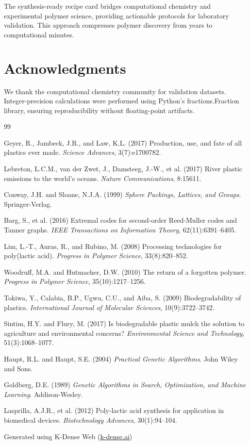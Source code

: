 \documentclass[11pt]{article}
\begin{document}
The synthesis-ready recipe card bridges computational chemistry and experimental polymer science, providing actionable protocols for laboratory validation. This approach compresses polymer discovery from years to computational minutes.

\section*{Acknowledgments}

We thank the computational chemistry community for validation datasets. Integer-precision calculations were performed using Python's fractions.Fraction library, ensuring reproducibility without floating-point artifacts.

\begin{thebibliography}{99}

 Geyer, R., Jambeck, J.R., and Law, K.L. (2017) Production, use, and fate of all plastics ever made. \textit{Science Advances}, 3(7):e1700782.

 Lebreton, L.C.M., van der Zwet, J., Damsteeg, J.-W., et al. (2017) River plastic emissions to the world's oceans. \textit{Nature Communications}, 8:15611.

 Conway, J.H. and Sloane, N.J.A. (1999) \textit{Sphere Packings, Lattices, and Groups}. Springer-Verlag.

 Barg, S., et al. (2016) Extremal codes for second-order Reed-Muller codes and Tanner graphs. \textit{IEEE Transactions on Information Theory}, 62(11):6391--6405.

 Lim, L.-T., Auras, R., and Rubino, M. (2008) Processing technologies for poly(lactic acid). \textit{Progress in Polymer Science}, 33(8):820--852.

 Woodruff, M.A. and Hutmacher, D.W. (2010) The return of a forgotten polymer. \textit{Progress in Polymer Science}, 35(10):1217--1256.

 Tokiwa, Y., Calabia, B.P., Ugwu, C.U., and Aiba, S. (2009) Biodegradability of plastics. \textit{International Journal of Molecular Sciences}, 10(9):3722--3742.

 Sintim, H.Y. and Flury, M. (2017) Is biodegradable plastic mulch the solution to agriculture and environmental concerns? \textit{Environmental Science and Technology}, 51(3):1068--1077.

 Haupt, R.L. and Haupt, S.E. (2004) \textit{Practical Genetic Algorithms}. John Wiley and Sons.

 Goldberg, D.E. (1989) \textit{Genetic Algorithms in Search, Optimization, and Machine Learning}. Addison-Wesley.

 Lasprilla, A.J.R., et al. (2012) Poly-lactic acid synthesis for application in biomedical devices. \textit{Biotechnology Advances}, 30(1):94--104.

\end{thebibliography}

\vspace{2cm}

\noindent
\small Generated using K-Dense Web (\href{https://k-dense.ai}{k-dense.ai})
\end{document}

